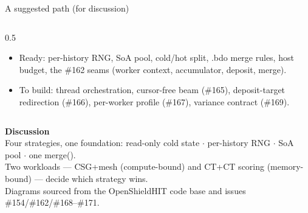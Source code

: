 \documentclass[aspectratio=169,10pt]{beamer}
\newcommand{\code}[1]{{\ttfamily\footnotesize #1}}
\begin{document}
\begin{frame}{A suggested path (for discussion)}
\begin{columns}[T]
\begin{column}{0.5\textwidth}
      \begin{itemize}\scriptsize\itemsep1pt
        \item \textcolor{oshGreen}{Ready:} per-history RNG, SoA pool, cold/hot
              split, \code{.bdo} merge rules, host budget, the \#162 seams
              (worker context, accumulator, deposit, merge).
        \item \textcolor{oshAmber}{To build:} thread orchestration, cursor-free
              beam (\#165), deposit-target redirection (\#166), per-worker
              profile (\#167), variance contract (\#169).
      \end{itemize}
    \end{column}
  \end{columns}
\end{frame}

\begin{frame}[plain]
  \centering
  \vfill
  {\Large\color{oshBlue}\textbf{Discussion}}\\[2mm]
  \small\color{oshGrey}
  Four strategies, one foundation: read-only cold state $\cdot$ per-history RNG
  $\cdot$ SoA pool $\cdot$ one \code{merge()}.\\
  Two workloads — CSG+mesh (compute-bound) and CT+CT scoring (memory-bound) —
  decide which strategy wins.\\
  Diagrams sourced from the OpenShieldHIT code base and issues \#154/\#162/\#168--\#171.
  \vfill
\end{frame}
\end{document}
